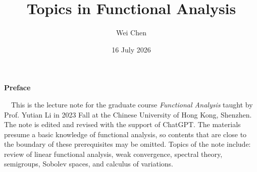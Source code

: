 \documentclass[11pt,oneside]{book}
\title{\Huge \textbf{Topics in Functional Analysis}}
\author{Wei Chen}
\date{16 July 2026}
\theoremstyle{mystyle}
\begin{document}
\maketitle
	\allowdisplaybreaks
	\setcounter{page}{1}
	\begin{center}
		\Large\textbf{Preface} 

        
        
    \end{center}~\
        This is the lecture note for the graduate course \textit{Functional Analysis} taught by Prof. Yutian Li in 2023 Fall at the Chinese University of Hong Kong, Shenzhen. The note is edited and revised with the support of ChatGPT. The materials presume a basic knowledge of functional analysis, so contents that are close to the boundary of these prerequisites may be omitted. Topics of the note include: review of linear functional analysis, weak convergence, spectral theory, semigroups, Sobolev spaces, and calculus of variations.
	\newpage
	\tableofcontents
{}








\end{document}

